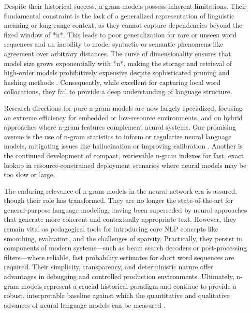 \documentclass[10pt,a4paper]{article}
\begin{document}
Despite their historical success, n-gram models possess inherent limitations. Their fundamental constraint is the lack of a generalized representation of linguistic meaning or long-range context, as they cannot capture dependencies beyond the fixed window of *n*. This leads to poor generalization for rare or unseen word sequences and an inability to model syntactic or semantic phenomena like agreement over arbitrary distances. The curse of dimensionality ensures that model size grows exponentially with *n*, making the storage and retrieval of high-order models prohibitively expensive despite sophisticated pruning and hashing methods \cite{heafield2022findings}. Consequently, while excellent for capturing local word collocations, they fail to provide a deep understanding of language structure.

Research directions for pure n-gram models are now largely specialized, focusing on extreme efficiency for embedded or low-resource environments, and on hybrid approaches where n-gram features complement neural systems. One promising avenue is the use of n-gram statistics to inform or regularize neural language models, mitigating issues like hallucination or improving calibration \cite{shekhar1992generalization}. Another is the continued development of compact, retrievable n-gram indexes for fast, exact lookup in resource-constrained deployment scenarios where neural models may be too slow or large.

The enduring relevance of n-gram models in the neural network era is assured, though their role has transformed. They are no longer the state-of-the-art for general-purpose language modeling, having been superseded by neural approaches that generate more coherent and contextually appropriate text. However, they remain vital as pedagogical tools for introducing core NLP concepts like smoothing, evaluation, and the challenges of sparsity. Practically, they persist in components of modern systems—such as beam search decoders or post-processing filters—where reliable, fast probability estimates for short word sequences are required. Their simplicity, transparency, and deterministic nature offer advantages in debugging and controlled production environments. Ultimately, n-gram models represent a crucial historical paradigm and continue to provide a robust, interpretable baseline against which the quantitative and qualitative advances of neural language models can be measured \cite{anonymousnoneslp}.
\end{document}
